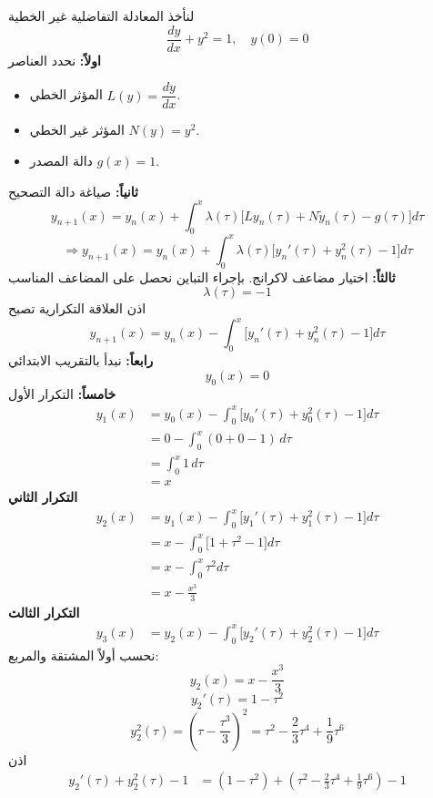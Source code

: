\begin{example}
	لنأخذ المعادلة التفاضلية غير الخطية
	\[
	\frac{dy}{dx} + y^2 = 1, \quad y(0)=0
	\]
	\textbf{اولاً:} نحدد العناصر 
	\begin{itemize}
		\item المؤثر الخطي $L(y) = \dfrac{dy}{dx}$.
		\item المؤثر غير الخطي $N(y) = y^2$.
		\item دالة المصدر $g(x) = 1$.
	\end{itemize}
	\textbf{ثانياً:} صياغة دالة التصحيح
	\[
	y_{n+1}(x) = y_n(x) + \int_{0}^{x} 
	\lambda(\tau) 
	\Big[
	L y_n(\tau) + N \tilde{y}_n(\tau) - g(\tau)
	\Big] d\tau
	\]
	\[
	\Rightarrow
	y_{n+1}(x) = y_n(x) + \int_{0}^{x} 
	\lambda(\tau) 
	\Big[
	y_n'(\tau) + y_n^2(\tau) - 1
	\Big] d\tau
	\]
	\textbf{ثالثاً:} اختيار مضاعف لاكرانج.  
	بإجراء التباين نحصل على المضاعف المناسب
	\[
	\lambda(\tau) = -1
	\]
	اذن العلاقة التكرارية تصبح
	\[
	y_{n+1}(x) =
	y_n(x) -
	\int_{0}^{x}
	\Big[
	y_n'(\tau) + y_n^2(\tau) - 1
	\Big] d\tau
	\]
	\textbf{رابعاً:} نبدأ بالتقريب الابتدائي
	\[
	y_0(x)=0
	\]
	\textbf{خامساً:} التكرار الأول
	\begin{align*}
		y_1(x)
		&= y_0(x) -
		\int_{0}^{x}
		\Big[
		y_0'(\tau) + y_0^2(\tau) - 1
		\Big] d\tau \\
		&= 0 - \int_{0}^{x} (0 + 0 - 1)\, d\tau \\
		&= \int_{0}^{x} 1\, d\tau \\
		&= x
	\end{align*}
	\textbf{التكرار الثاني}
	\begin{align*}
		y_2(x)
		&= y_1(x) -
		\int_{0}^{x}
		\Big[
		y_1'(\tau) + y_1^2(\tau) - 1
		\Big] d\tau \\
		&= x -
		\int_{0}^{x}
		\Big[
		1 + \tau^2 - 1
		\Big] d\tau \\
		&= x - \int_{0}^{x} \tau^2 d\tau \\
		&= x - \frac{x^3}{3}
	\end{align*}
\textbf{التكرار الثالث}
\begin{align*}
	y_3(x)
	&= y_2(x) -
	\int_{0}^{x}
	\Big[
	y_2'(\tau) + y_2^2(\tau) - 1
	\Big] d\tau
\end{align*}
نحسب أولاً المشتقة والمربع:
\[
y_2(x)=x-\frac{x^3}{3}
\]
\[
y_2'(\tau)=1-\tau^2
\]
\[
y_2^2(\tau)=\left(\tau-\frac{\tau^3}{3}\right)^2
= \tau^2-\frac{2}{3}\tau^4+\frac{1}{9}\tau^6
\]
اذن 
\begin{align*}
	y_2'(\tau)+y_2^2(\tau)-1
	&=(1-\tau^2)+\left(\tau^2-\frac{2}{3}\tau^4+\frac{1}{9}\tau^6\right)-1 \\

\end{align*}
\end{example}
